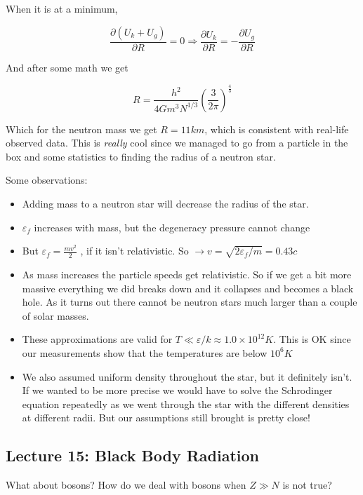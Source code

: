 \documentclass[10pt]{article}
\begin{document}
\begin{example}
	When it is at a minimum,

	\begin{equation}
		\frac{\partial (U_k + U_g)}{\partial R}  = 0 \Rightarrow \frac{\partial U_k}{\partial R} = - \frac{\partial U_g}{\partial R}
	\end{equation}

	And after some math we get

	\begin{equation}
		R = \frac{h^2}{4Gm^3 N^{1 /3}} (\frac{3}{2\pi})^{\frac{4}{3}}
	\end{equation}

	Which for the neutron mass we get $ R = 11 km $, which is consistent with real-life observed data.
	This is \textit{really} cool since we managed to go from a particle in the box and some statistics to finding the radius of a neutron star.

	

\end{example}

Some observations:
\begin{itemize}
	\item Adding mass to a neutron star will decrease the radius of the star.
	\item $ \varepsilon_f $ increases with mass, but the degeneracy pressure cannot change
	\item But $ \varepsilon_f  = \frac{mv^2}{2}$ , if it isn't relativistic. So $ \rightarrow v = \sqrt{2\varepsilon_f/m} = 0.43c  $ 
	\item As mass increases the particle speeds get relativistic. So if we get a bit more massive everything we did breaks down and it collapses and becomes a black hole. As it turns out there cannot be neutron stars much larger than a couple of solar masses.
	\item These approximations are valid for $ T \ll \varepsilon /k \approx 1.0 \times 10^{12} K  $. This is OK since our measurements show that the temperatures are below $ 10^6 K $ 
	\item We also assumed uniform density throughout the star, but it definitely isn't. If we wanted to be more precise we would have to solve the Schrodinger equation repeatedly as we went through the star with the different densities at different radii. But our assumptions still brought is pretty close!
\end{itemize}


\subsection{Lecture 15: Black Body Radiation}
\begin{blockquote}
	What about bosons? How do we deal with bosons when $ Z \gg N $  is not true?
\end{blockquote}
\end{document}
